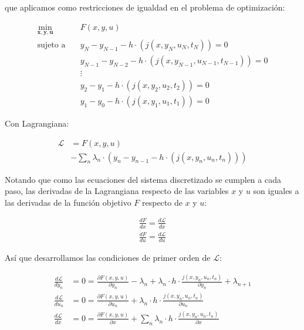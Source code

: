 que aplicamos como restricciones de igualdad en el problema de optimización:

\begin{align}
	\min_{\mathbf{x}, \mathbf{y}, \mathbf{u}} \quad & F(x, y, u)                                                                  \\
	\text{sujeto a} \quad                           & y_N - y_{N-1} - h \cdot (j(x, y_N, u_N, t_N)) = 0   \nonumber               \\
	                                                & y_{N-1} - y_{N-2} - h \cdot (j(x, y_{N-1}, u_{N-1}, t_{N-1})) = 0 \nonumber \\
	                                                & \vdots \nonumber                                                            \\
	                                                & y_{2} - y_{1} - h \cdot (j(x, y_{2}, u_{2}, t_{2})) = 0 \nonumber           \\
	                                                & y_{1} - y_{0} - h \cdot (j(x, y_{1}, u_{1}, t_{1})) = 0
\end{align}

Con Lagrangiana:


\begin{align}
	\mathcal{L} & = F(x, y, u) \nonumber                                                                              \\
	            & - \sum_n \lambda_n \cdot (y_n - y_{n-1} - h \cdot (j(x, y_n, u_n, t_n)))  \label{eq:ode_lagrangian}
\end{align}

Notando que como las ecuaciones del sistema discretizado se cumplen a cada
paso, las derivadas de la Lagrangiana respecto de las variables $x$ y $u$ son
iguales a las derivadas de la función objetivo $F$ respecto de $x$ y $u$:

\begin{align}
	\frac{dF}{dx} = \frac{d\mathcal{L}}{dx} \nonumber \\
	\frac{dF}{du} = \frac{d\mathcal{L}}{du}
\end{align}


Así que desarrollamos las condiciones de primer orden de $\mathcal{L}$:

\begin{align}
	\frac{d\mathcal{L}}{dy_n} & = 0 = \frac{\partial F(x, y, u)}{\partial y_n} - \lambda_n + \lambda_n \cdot h \cdot \frac{j(x, y_n, u_n, t_n)}{\partial y_n} + \lambda_{n+1} \label{eq:dl_dy_n_ode} \\
	\frac{d\mathcal{L}}{du_n} & = 0 = \frac{\partial F(x, y, u)}{\partial u_n} + \lambda_n \cdot h \cdot \frac{j(x, y_n, u_n, t_n)}{\partial u_n} \label{eq:dl_du_n_ode}                             \\
	\frac{d\mathcal{L}}{dx}   & = 0 = \frac{\partial F(x, y, u)}{\partial x} + \sum_n \lambda_n \cdot h \cdot \frac{j(x, y_n, u_n, t_n)}{\partial x}  \label{eq:dl_dx_ode}
\end{align}

